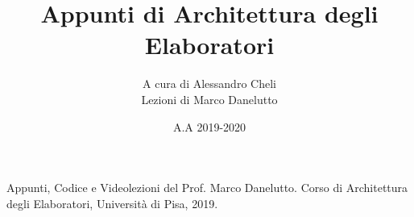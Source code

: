 \documentclass[a4paper,11pt]{book}
\theoremstyle{plain}%
\theoremstyle{definition}
\theoremstyle{remark}
\begin{document}
\author{A cura di Alessandro Cheli \\ Lezioni di Marco Danelutto}
\title{Appunti di Architettura degli Elaboratori}
\date{A.A 2019-2020}

\frontmatter
\maketitle
\tableofcontents

\mainmatter










\backmatter



\begin{thebibliography}{9}
	Appunti, Codice e Videolezioni del Prof. Marco Danelutto.
	Corso di Architettura degli Elaboratori, Università di Pisa, 2019.
\end{thebibliography}

\end{document}
